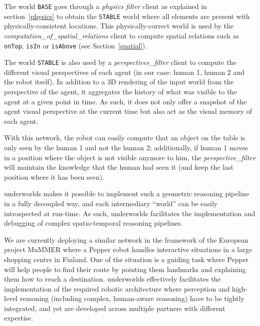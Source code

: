 \documentclass[letterpaper, 10pt, conference]{ieeeconf}
\newcommand{\uwds}{{\sc underworlds}\xspace}
\begin{document}
The world \texttt{BASE} goes through a \textit{physics filter} client as
explained in section~\ref{physics} to obtain the \texttt{STABLE} world where all
elements are present with physically-consistent locations. This
physically-correct world is used by the
\textit{computation\_of\_spatial\_relations} client to compute spatial relations
such as {\tt onTop}, {\tt isIn} or {\tt isAbove} (see Section~\ref{spatial}).

The world \texttt{STABLE} is also used by a \textit{perspectives\_filter} client
to compute the different visual perspectives of each agent (in our case: human
1, human 2 and the robot itself). In addition to a 3D rendering of the input
world from the perspective of the agent, it aggregates the history of what was
visible to the agent at a given point in time. As such, it does not only offer a
snapshot of the agent visual perspective at the current time but also act as the
visual memory of each agent.


With this network, the robot can easily compute that an object on
the table is only seen by the human 1 and not the human 2; additionally, if
human 1 moves in a position where the object is not visible anymore to him, the
\textit{perspective\_filter} will maintain the knowledge that the human had
seen it (and keep the last position where it has been seen).

\uwds makes it possible to implement such a geometric reasoning pipeline in a
fully decoupled way, and each intermediary ``world'' can be easily introspected
at run-time. As such, \uwds facilitates the implementation and debugging of complex
spatio-temporal reasoning pipelines.


We are currently deploying a similar network in the framework of the
European project MuMMER where a Pepper robot handles interactive
situations in a large shopping centre in Finland. One of the situation is a guiding task where
Pepper will help people to find their route by pointing them landmarks and
explaining them how to reach a destination. \uwds effectively facilitates the
implementation of the required robotic architecture where perception and high-level
reasoning (including complex, human-aware reasoning) have to be tightly
integrated, and yet are developed across multiple partners with different
expertise.

\end{document}
